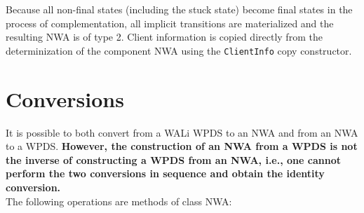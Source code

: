 \documentclass{llncs}
\begin{document}
Because all non-final states (including the stuck state) become final states in the process of complementation, all implicit transitions are materialized and the resulting NWA is of type 2.  Client information is copied directly from the determinization of the component NWA using the \texttt{ClientInfo} copy constructor.

\section{Conversions}
\label{Se:Conversions}


It is possible to both convert from a WALi WPDS to an NWA and from an NWA to a WPDS.  \textbf{However, the construction of an NWA from a WPDS is not the inverse of constructing a WPDS from an NWA, i.e., one cannot perform the two conversions in sequence and obtain the identity conversion.} \\

\noindent The following operations are methods of class NWA:
\end{document}
